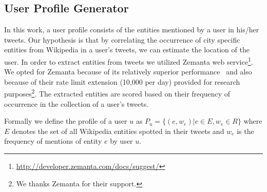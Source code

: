 \subsection{User Profile Generator}
In this work, a user profile consists of the entities mentioned by a user in his/her tweets. 
Our hypothesis is that by correlating the occurrence of city specific entities from Wikipedia in a user’s tweets, we can estimate the location of the user. In order to extract entities from tweets we utilized Zemanta web service\footnote{\url{http://developer.zemanta.com/docs/suggest/}}. 
We opted for Zemanta because of its relatively superior performance~\cite{derczynski2013} and also because of their rate limit extension (10,000 per day) provided for research purposes\footnote{We thanks Zemanta for their support.}. The extracted entities are scored based on their frequency of occurrence in the collection of a user's tweets.

Formally we define the profile of a user $u$ as $P_{u}=\{(e,w_{e})|e \in E, w_{e} \in R\}$ where $E$ denotes the set of all Wikipedia entities spotted in their tweets and $w_{e}$ is the frequency of mentions of entity $e$ by user $u$.  

